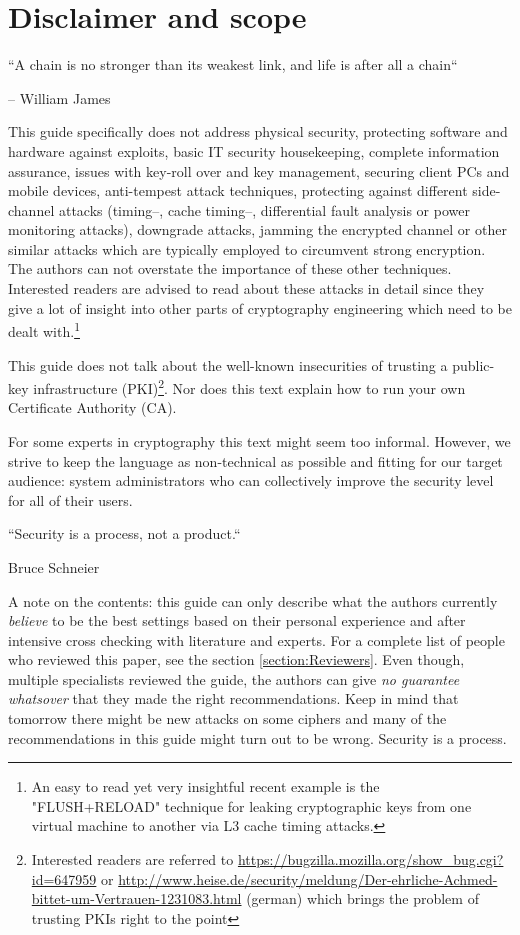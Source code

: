 \section{Disclaimer and scope}
\label{section:disclaimer}

\epigraph{``A chain is no stronger than its weakest link, and life is after all a chain``}{-- William James}


This guide specifically does not address physical security, protecting software
and hardware against exploits, basic IT security housekeeping, complete
information assurance, issues with key-roll over and key management, securing client PCs and mobile devices, 
anti-tempest\cite{Wikipedia:Tempest} attack techniques,
protecting against different side-channel attacks (timing--, cache timing--,
differential fault analysis or power monitoring attacks), downgrade attacks,
jamming the encrypted channel or other similar attacks which are typically
employed to circumvent strong encryption.  The authors can not overstate the
importance of these other techniques.  Interested readers are advised to read
about these attacks in detail since they give a lot of insight into other parts
of cryptography engineering which need to be dealt with.\footnote{An easy to
read yet very insightful recent example is the "FLUSH+RELOAD" technique \cite{yarom2013flush+} for
leaking cryptographic keys from one virtual machine to another via L3 cache
timing attacks.}

This guide does not talk about the well-known insecurities of trusting a
public-key infrastructure (PKI)\footnote{Interested readers are referred to
\url{https://bugzilla.mozilla.org/show_bug.cgi?id=647959} or
\url{http://www.heise.de/security/meldung/Der-ehrliche-Achmed-bittet-um-Vertrauen-1231083.html}
(german) which brings the problem of trusting PKIs right to the point}. Nor
does this text explain how to run your own Certificate Authority (CA). 


For some experts in cryptography this text might seem too informal. However, we
strive to keep the language as non-technical as possible and fitting for our
target audience: system administrators who can collectively improve the
security level for all of their users. 



\epigraph{``Security is a process, not a product.``}{Bruce Schneier}

A note on the contents: this guide can only describe what the authors currently
\emph{believe} to be the best settings based on their personal experience and
after intensive cross checking with literature and experts. For a complete list
of people who reviewed this paper, see the section \ref{section:Reviewers}.
Even though, multiple specialists reviewed the guide, the authors can give
\emph{no guarantee whatsover} that they made the right recommendations. Keep in
mind that tomorrow there might be new attacks on some ciphers and many of the
recommendations in this guide might turn out to be wrong. Security is a
process.


